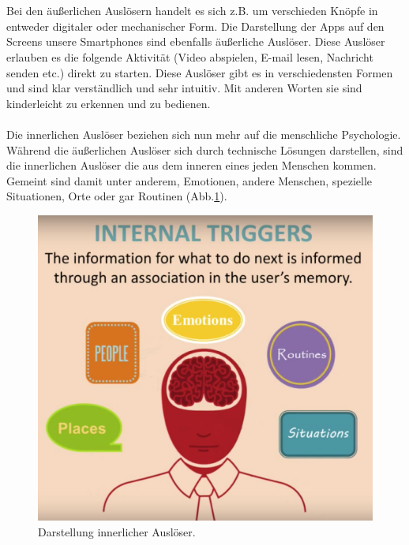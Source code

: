\documentclass[a4paper,12pt]{scrartcl}
\begin{document}
\\\\
Bei den äußerlichen Auslösern handelt es sich z.B. um verschieden Knöpfe in entweder digitaler oder mechanischer Form. Die Darstellung der Apps auf den Screens unsere Smartphones sind ebenfalls äußerliche Auslöser. Diese Auslöser erlauben es die folgende Aktivität (Video abspielen, E-mail lesen, Nachricht senden etc.) direkt zu starten. Diese Auslöser gibt es in verschiedensten Formen und sind klar verständlich und sehr intuitiv. Mit anderen Worten sie sind kinderleicht zu erkennen und zu bedienen\cite{Eyal2014}.
\\\\
Die innerlichen Auslöser beziehen sich nun mehr auf die menschliche Psychologie. Während die äußerlichen Auslöser sich durch technische Lösungen darstellen, sind die innerlichen Auslöser die aus dem inneren eines jeden Menschen kommen. Gemeint sind damit unter anderem, Emotionen, andere Menschen, spezielle Situationen, Orte oder gar Routinen (Abb.\ref{internalTriggerBild}).
\\
\begin{figure}[h!]
\begin{center}
\includegraphics[scale = 0.3]{Bilder/internalTrigger.eps}
\caption{Darstellung innerlicher Auslöser\cite{ExternalTrigger2018}.}
\label{internalTriggerBild}
\end{center}
\end{figure} 
\end{document}
